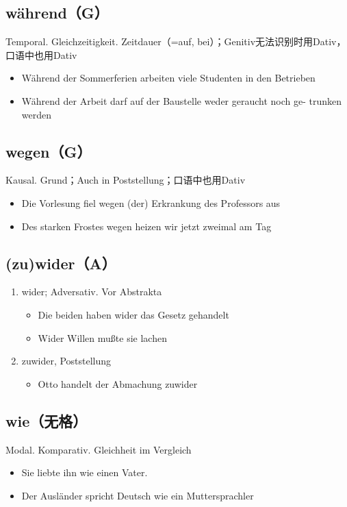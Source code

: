 \documentclass[UTF8]{report}
\begin{document}
\subsection{während（G）}
Temporal. Gleichzeitigkeit. Zeitdauer（=auf, bei）；Genitiv无法识别时用Dativ，口语中也用Dativ
\begin{itemize}
    \item Während der Sommerferien arbeiten viele Studenten in den Betrieben
    \item Während der Arbeit darf auf der Baustelle weder geraucht noch ge- trunken werden
\end{itemize}

\subsection{wegen（G）}
Kausal. Grund；Auch in Poststellung；口语中也用Dativ
\begin{itemize}
    \item Die Vorlesung fiel wegen (der) Erkrankung des Professors aus
    \item Des starken Frostes wegen heizen wir jetzt zweimal am Tag
\end{itemize}

\subsection{(zu)wider（A）}
\begin{enumerate}
    \item wider; Adversativ. Vor Abstrakta
    \begin{itemize}
        \item Die beiden haben wider das Gesetz gehandelt
        \item Wider Willen mußte sie lachen
    \end{itemize}
    \item zuwider, Poststellung
    \begin{itemize}
        \item Otto handelt der Abmachung zuwider
    \end{itemize}
\end{enumerate}

\subsection{wie（无格）}
Modal. Komparativ. Gleichheit im Vergleich
\begin{itemize}
    \item Sie liebte ihn wie einen Vater.
    \item Der Ausländer spricht Deutsch wie ein Muttersprachler
\end{itemize}
\end{document}
